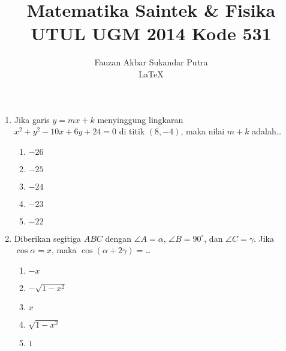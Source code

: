 \documentclass[A4,12PT, english, twocolumn]{journal}
\title{Matematika Saintek \& Fisika UTUL UGM 2014 Kode 531}
\author{Fauzan Akbar Sukandar Putra \\ \LaTeX}
\begin{document}
\maketitle

\begin{enumerate}

\item Jika garis $y=mx+k$ menyinggung lingkaran \\ $x^2+y^2-10x+6y+24=0$ di titik $(8,-4)$, maka nilai $m+k$ adalah\dots
    \begin{enumerate}
        \item $-26$
        \item $-25$
        \item $-24$
        \item $-23$
        \item $-22$
    \end{enumerate}

\item Diberikan segitiga $ABC$ dengan $\angle A=\alpha$, $\angle B=90^\circ$, dan $\angle C=\gamma$. Jika $\cos{\alpha}=x$, maka $\cos{\left(\alpha+2\gamma \right)}=$\dots
    \begin{enumerate}
        \item $-x$
        \item $-\sqrt{1-x^2}$
        \item $x$
        \item $\sqrt{1-x^2}$
        \item $1$
    \end{enumerate}


\end{enumerate}
\end{document}
